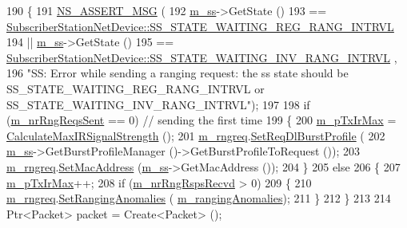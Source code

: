 \begin{DoxyCode}
190 \{
191   \hyperlink{assert_8h_aff5ece9066c74e681e74999856f08539}{NS\_ASSERT\_MSG} (
192     \hyperlink{classns3_1_1SSLinkManager_a44506c63befdc33eb0e0b4ba7f93d498}{m\_ss}->GetState ()
193     == \hyperlink{classns3_1_1SubscriberStationNetDevice_af9f145bc05df1f18610a3d4b61ff9ee4a49bac6877dbda9589f7576e42cf5c15f}{SubscriberStationNetDevice::SS\_STATE\_WAITING\_REG\_RANG\_INTRVL}
194     || \hyperlink{classns3_1_1SSLinkManager_a44506c63befdc33eb0e0b4ba7f93d498}{m\_ss}->GetState ()
195     == \hyperlink{classns3_1_1SubscriberStationNetDevice_af9f145bc05df1f18610a3d4b61ff9ee4aba899a8d6171ee1a9a924dde6c62f16f}{SubscriberStationNetDevice::SS\_STATE\_WAITING\_INV\_RANG\_INTRVL}
      ,
196     \textcolor{stringliteral}{"SS: Error while sending a ranging request: the ss state should be SS\_STATE\_WAITING\_REG\_RANG\_INTRVL or
       SS\_STATE\_WAITING\_INV\_RANG\_INTRVL"});
197 
198   \textcolor{keywordflow}{if} (\hyperlink{classns3_1_1SSLinkManager_a28fe764252091022ad2f4fc1ae8a0cbc}{m\_nrRngReqsSent} == 0) \textcolor{comment}{// sending the first time}
199     \{
200       \hyperlink{classns3_1_1SSLinkManager_a2ab2dc4d93d45e1d43163c02c5d38869}{m\_pTxIrMax} = \hyperlink{classns3_1_1SSLinkManager_a20ff29424fb97fb9ee82fbac0b0fdd8f}{CalculateMaxIRSignalStrength} ();
201       \hyperlink{classns3_1_1SSLinkManager_a3529ea909c47514bd720211fb5bb3702}{m\_rngreq}.\hyperlink{classns3_1_1RngReq_a18474f33aefdb93944417fdc949e2b8f}{SetReqDlBurstProfile} (
202         \hyperlink{classns3_1_1SSLinkManager_a44506c63befdc33eb0e0b4ba7f93d498}{m\_ss}->GetBurstProfileManager ()->GetBurstProfileToRequest ());
203       \hyperlink{classns3_1_1SSLinkManager_a3529ea909c47514bd720211fb5bb3702}{m\_rngreq}.\hyperlink{classns3_1_1RngReq_a7ca0032632d0cc4d56779bf7cd9a67ab}{SetMacAddress} (\hyperlink{classns3_1_1SSLinkManager_a44506c63befdc33eb0e0b4ba7f93d498}{m\_ss}->GetMacAddress ());
204     \}
205   \textcolor{keywordflow}{else}
206     \{
207       \hyperlink{classns3_1_1SSLinkManager_a2ab2dc4d93d45e1d43163c02c5d38869}{m\_pTxIrMax}++;
208       \textcolor{keywordflow}{if} (\hyperlink{classns3_1_1SSLinkManager_a52b9d5b8bc2d27a3ef604735ee731afc}{m\_nrRngRspsRecvd} > 0)
209         \{
210           \hyperlink{classns3_1_1SSLinkManager_a3529ea909c47514bd720211fb5bb3702}{m\_rngreq}.\hyperlink{classns3_1_1RngReq_a4eef7a7c66363543a5e2f47f297c2a22}{SetRangingAnomalies} (
      \hyperlink{classns3_1_1SSLinkManager_af2f529561d4191695c6b4dc049dbda04}{m\_rangingAnomalies});
211         \}
212     \}
213 
214   Ptr<Packet> packet = Create<Packet> ();

\end{DoxyCode}
